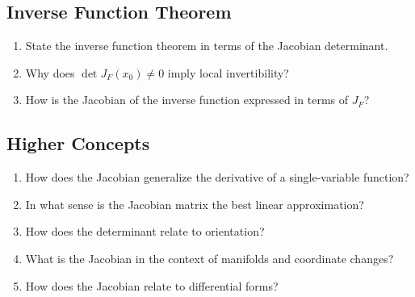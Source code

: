 \subsection{Inverse Function Theorem}
\begin{enumerate}[resume]
  \item State the inverse function theorem in terms of the Jacobian determinant.
  \item Why does $\det J_F(x_0) \neq 0$ imply local invertibility?
  \item How is the Jacobian of the inverse function expressed in terms of $J_F$?
\end{enumerate}

\subsection{Higher Concepts}
\begin{enumerate}[resume]
  \item How does the Jacobian generalize the derivative of a single-variable function?
  \item In what sense is the Jacobian matrix the best linear approximation?
  \item How does the determinant relate to orientation?
  \item What is the Jacobian in the context of manifolds and coordinate changes?
  \item How does the Jacobian relate to differential forms?
\end{enumerate}
